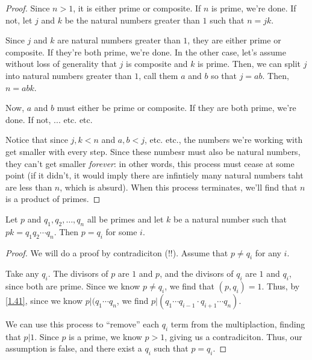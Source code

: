 \documentclass[../main.tex]{subfiles}
\begin{document}
 \begin{proof}
   Since $n > 1$, it is either prime or composite. If $n$ is prime, we're done. If not, let $j$ and $k$ be the natural numbers greater than $1$ such that $n = jk$.

   Since $j$ and $k$ are natural numbers greater than $1$, they are either prime or composite. If they're both prime, we're done. In the other case, let's assume without loss of generality that $j$ is composite and $k$ is prime. Then, we can split $j$ into natural numbers greater than $1$, call them $a$ and $b$ so that $j = ab$. Then, $n = abk$.

   Now, $a$ and $b$ must either be prime or composite. If they are both prime, we're done. If not, ... etc. etc.

   Notice that since $j, k < n$ and $a, b < j$, etc. etc., the numbers we're working with get smaller with every step. Since these numbesr must also be natural numbers, they can't get smaller \emph{forever}: in other words, this process must cease at some point (if it didn't, it would imply there are infintiely many natural numbers taht are less than $n$, which is absurd). When this process terminates, we'll find that $n$ is a product of primes.
 \end{proof}



\begin{thm} \label{2.8}
  Let $p$ and $q_1, q_2, \ldots, q_n$ all be primes and let $k$ be a natural number such that $pk = q_1 q_2 \cdots q_n$. Then $p = q_i$ for some $i$.
\end{thm}

\begin{proof}
  We will do a proof by contradiciton (!!). Assume that $p \neq q_i$ for any $i$.

  Take any $q_i$. The divisors of $p$ are $1$ and $p$, and the divisors of $q_i$ are $1$ and $q_i$, since both are prime. Since we know $p \neq q_i$, we find that $(p, q_i) = 1$. Thus, by \ref{1.41}, since we know $p | (q_1 \cdots q_n$, we find $p | (q_1 \cdots q_{i-1} \cdot q_{i+1} \cdots q_n)$.

  We can use this process to ``remove'' each $q_i$ term from the multiplaction, finding that $p | 1$. Since $p$ is a prime, we know $p > 1$, giving us a contradiciton. Thus, our assumption is false, and there exist a $q_i$ such that $p = q_i$.
\end{proof}
\end{document}
